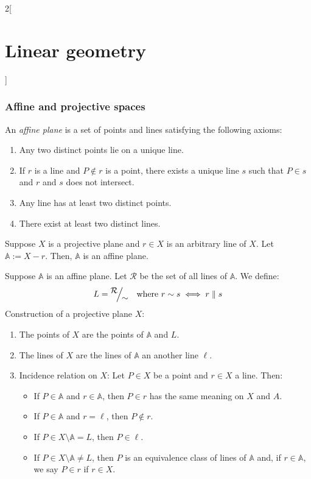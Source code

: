 \documentclass[../../../main_math.tex]{subfiles}
\begin{document}
\begin{multicols}{2}[\section{Linear geometry}]
  \subsubsection{Affine and projective spaces}
  \begin{definition}
    An \emph{affine plane} is a set of points and lines satisfying the following axioms:
    \begin{enumerate}
      \item Any two distinct points lie on a unique line.
      \item If $r$ is a line and $P\notin r$ is a point, there exists a unique line $s$ such that $P\in s$ and $r$ and $s$ does not intersect.
      \item Any line has at least two distinct points.
      \item There exist at least two distinct lines.
    \end{enumerate}
  \end{definition}
  \begin{proposition}
    Suppose $X$ is a projective plane and $r\in X$ is an arbitrary line of $X$. Let $\mathbb{A}:=X-r.$ Then, $\mathbb{A}$ is an affine plane.
  \end{proposition}
  \begin{proposition}
    Suppose $\mathbb{A}$ is an affine plane. Let $\mathcal{R}$ be the set of all lines of $\mathbb{A}$. We define: $$L=\quot{\mathcal{R}}{\sim}\quad\text{where }r\sim s\iff r \parallel s$$ Construction of a projective plane $X$:
    \begin{enumerate}
      \item The points of $X$ are the points of $\mathbb{A}$ and $L$.
      \item The lines of $X$ are the lines of $\mathbb{A}$ an another line $\ell$.
      \item Incidence relation on $X$: Let $P\in X$ be a point and $r\in X$ a line. Then:
            \begin{itemize}
              \item If $P\in\mathbb{A}$ and $r\in\mathbb{A}$, then $P\in r$ has the same meaning on $X$ and $A$.
              \item If $P\in\mathbb{A}$ and $r=\ell$, then $P\notin r$.
              \item If $P\in X\setminus\mathbb{A}=L$, then $P\in\ell$.
              \item If $P\in X\setminus\mathbb{A}\ne L$, then $P$ is an equivalence class of lines of $\mathbb{A}$ and, if $r\in\mathbb{A}$, we say $P\in r$ if $r\in X$.
            \end{itemize}
    \end{enumerate}
  \end{proposition}

\end{multicols}
\end{document}
